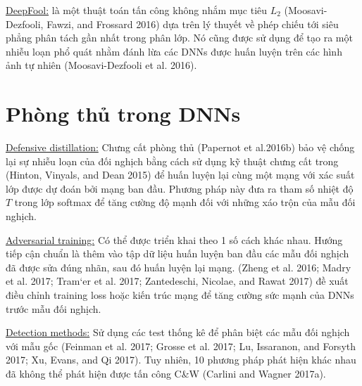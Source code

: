 \underline{DeepFool:} là một thuật toán tấn công không nhắm mục tiêu $L_2$ (Moosavi-Dezfooli, 
Fawzi, and Frossard 2016) dựa trên lý thuyết về phép chiếu tới siêu phẳng phân tách gần nhất
trong phân lớp. Nó cũng được sử dụng để tạo ra một nhiễu loạn phổ quát nhằm đánh lừa 
các DNNs được huấn luyện trên các hình ảnh tự nhiên (Moosavi-Dezfooli et al. 2016).

\section{Phòng thủ trong DNNs}
\underline{Defensive distillation:} Chưng cất phòng thủ (Papernot et al.2016b) bảo vệ 
chống lại sự nhiễu loạn của đối nghịch bằng cách sử dụng kỹ thuật chưng cất trong (Hinton, 
Vinyals, and Dean 2015) để huấn luyện lại cùng một mạng với xác suất lớp được dự đoán bởi 
mạng ban đầu. Phương pháp này đưa ra tham số nhiệt độ $T$ trong lớp softmax để tăng cường 
độ mạnh đối với những xáo trộn của mẫu đối nghịch.

\underline{Adversarial training:} Có thể được triển khai theo 1 số cách khác nhau. 
Hướng tiếp cận chuẩn là thêm vào tập dữ liệu huấn luyện ban đầu các mẫu đối nghịch đã được 
sửa đúng nhãn, sau đó huấn luyện lại mạng. (Zheng et al. 2016; Madry et al. 2017; 
Tram`er et al. 2017; Zantedeschi, Nicolae, and Rawat 2017) đề xuất điều chỉnh training 
loss hoặc kiến trúc mạng để tăng cường sức mạnh của DNNs trước mẫu đối nghịch.

\underline{Detection methods:} Sử dụng các test thống kê để phân biệt các mẫu đối nghịch 
với mẫu gốc (Feinman et al. 2017; Grosse et al. 2017; Lu, Issaranon, and Forsyth 2017; 
Xu, Evans, and Qi 2017). Tuy nhiên, 10 phương pháp phát hiện khác nhau đã không thể phát 
hiện được tấn công C\&W (Carlini and Wagner 2017a).
